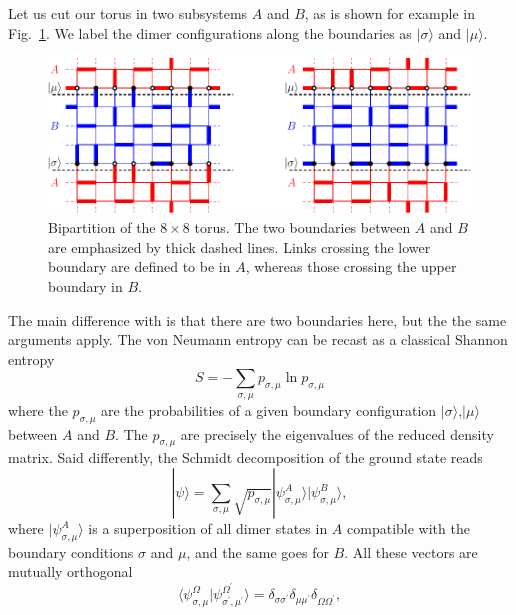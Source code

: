 \documentclass[11pt]{iopart}
\newcommand{\psm}{p_{\sigma,\mu}}
\begin{document}
Let us cut our torus in two subsystems $A$ and $B$, as is shown for example in Fig.~\ref{fig:bipartition}. We label the dimer configurations along the boundaries as $|\sigma\rangle$ and $|\mu\rangle$.
\begin{figure}[ht]
\begin{center}
\includegraphics[scale=0.8]{./figures/bipartition.pdf}
\end{center}
\caption{Bipartition of the $8\times 8$ torus. The two boundaries between $A$ and $B$ are emphasized by thick dashed lines. Links crossing the lower boundary are defined to be in $A$, whereas those crossing the upper boundary in $B$.}
\label{fig:bipartition}
\end{figure}
The main difference with \cite{Shannonee} is that there are two boundaries here, but the the same arguments apply. The von Neumann entropy can be recast as a classical Shannon entropy
\begin{equation}
 S=-\sum_{\sigma,\mu} p_{\sigma,\mu} \ln p_{\sigma,\mu}
\end{equation}
where the $p_{\sigma,\mu}$ are the probabilities of a given boundary configuration $|\sigma\rangle$,$|\mu\rangle$ between $A$ and $B$. 
\label{sec:lg.}
The $\psm$ are precisely the eigenvalues of the reduced density matrix. Said differently, the Schmidt decomposition of the ground state reads
\begin{equation}\label{eq:schmidt}
|\psi\rangle=\sum_{
\sigma,\mu} \sqrt{p_{\sigma,\mu}}|\psi_{\sigma,\mu}^A\rangle |\psi_{\sigma,\mu}^B\rangle,
\end{equation}
where $|\psi_{\sigma,\mu}^A\rangle$ is a superposition of all dimer states in $A$ compatible with the boundary conditions $\sigma$ and $\mu$, and the same goes for $B$. All these vectors are mutually orthogonal
\begin{equation}\label{eq:schmidt_orthogonality}
\langle \psi_{\sigma,\mu}^\Omega|\psi_{\sigma^\prime,\mu^\prime}^{\Omega^\prime}\rangle=\delta_{\sigma \sigma^\prime}\delta_{\mu \mu^\prime}\delta_{\Omega \Omega^\prime},
\end{equation}
\end{document}
